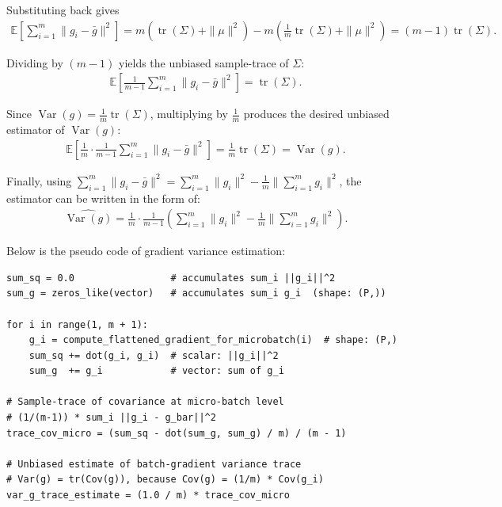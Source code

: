 \documentclass{article}
\makeatletter
\theoremstyle{plain}
\theoremstyle{definition}
\theoremstyle{remark}
\newcommand{\E}{\mathbb{E}}
\DeclareMathOperator{\Var}{Var}
\DeclareMathOperator{\tr}{tr}
\newlength{\secvspace}
\let\originalsubsection\subsection
\renewcommand{\subsection}{\@ifstar{\@subsectionstar}{\@subsectionnormal}}
\newcommand{\@subsectionnormal}[1]{%
  \vspace{-\secvspace}%
  \originalsubsection{#1}%
  \vspace{-\secvspace}%
}
\newcommand{\@subsectionstar}[1]{%
  \vspace{-\secvspace}%
  \originalsubsection*{#1}%
  \vspace{-\secvspace}%
}
\makeatother
\begin{document}
Substituting back gives
\begin{align*}
\textstyle \E[\sum_{i=1}^m \|g_i-\bar g\|^2]
= m(\tr(\Sigma)+\|\mu\|^2) - m(\frac{1}{m}\tr(\Sigma)+\|\mu\|^2)
= (m-1)\tr(\Sigma).
\end{align*}

Dividing by $(m-1)$ yields the unbiased sample-trace of $\Sigma$:
\begin{align*}
\textstyle \E[\frac{1}{m-1}\sum_{i=1}^m \|g_i-\bar g\|^2] = \tr(\Sigma).
\end{align*}

Since $\Var(g)=\frac{1}{m}\tr(\Sigma)$, multiplying by $\frac{1}{m}$ produces the desired unbiased estimator of $\Var(g)$:
\begin{align*}
\textstyle \E[\frac{1}{m}\cdot\frac{1}{m-1}\sum_{i=1}^m \|g_i-\bar g\|^2]
= \frac{1}{m}\tr(\Sigma) = \Var(g).
\end{align*}

Finally, using $\sum_{i=1}^m \|g_i-\bar g\|^2=\sum_{i=1}^m \|g_i\|^2-\frac{1}{m}\|\sum_{i=1}^m g_i\|^2$, the estimator can be written in the form of:
\begin{align*}
\textstyle \widehat{\Var(g)}
= \frac{1}{m}\cdot\frac{1}{m-1}(\sum_{i=1}^m \|g_i\|^2
- \frac{1}{m}\|\sum_{i=1}^m g_i\|^2).
\end{align*}

Below is the pseudo code of gradient variance estimation:

\begin{lstlisting}[caption={Gradient Variance Estimation}]
sum_sq = 0.0                 # accumulates sum_i ||g_i||^2
sum_g = zeros_like(vector)   # accumulates sum_i g_i  (shape: (P,))

for i in range(1, m + 1):
    g_i = compute_flattened_gradient_for_microbatch(i)  # shape: (P,)
    sum_sq += dot(g_i, g_i)  # scalar: ||g_i||^2
    sum_g  += g_i            # vector: sum of g_i

# Sample-trace of covariance at micro-batch level
# (1/(m-1)) * sum_i ||g_i - g_bar||^2
trace_cov_micro = (sum_sq - dot(sum_g, sum_g) / m) / (m - 1)

# Unbiased estimate of batch-gradient variance trace
# Var(g) = tr(Cov(g)), because Cov(g) = (1/m) * Cov(g_i)
var_g_trace_estimate = (1.0 / m) * trace_cov_micro
\end{lstlisting}

\clearpage

\subsection{Supplementary Results}
\label{app:supplementary-results}
\end{document}
